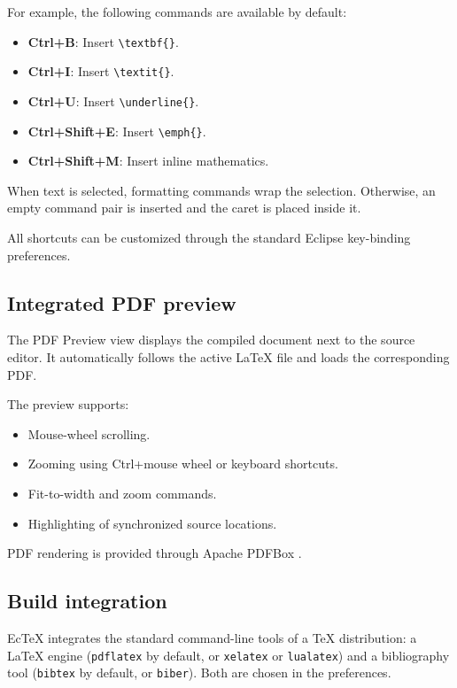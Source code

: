 \documentclass[11pt,a4paper]{article}
\begin{document}
For example, the following commands are available by
default:

\begin{itemize}[noitemsep]
    \item \textbf{Ctrl+B}: Insert \verb|\textbf{}|.
    \item \textbf{Ctrl+I}: Insert \verb|\textit{}|.
    \item \textbf{Ctrl+U}: Insert \verb|\underline{}|.
    \item \textbf{Ctrl+Shift+E}: Insert \verb|\emph{}|.
    \item \textbf{Ctrl+Shift+M}: Insert inline mathematics.
\end{itemize}

When text is selected, formatting commands wrap the
selection. Otherwise, an empty command pair is inserted
and the caret is placed inside it.

All shortcuts can be customized through the standard
Eclipse key-binding preferences.

\subsection{Integrated PDF preview}

The PDF Preview view displays the compiled document
next to the source editor. It automatically follows the
active LaTeX file and loads the corresponding PDF.

The preview supports:
\begin{itemize}[noitemsep]
    \item Mouse-wheel scrolling.
    \item Zooming using Ctrl+mouse wheel or keyboard
    shortcuts.
    \item Fit-to-width and zoom commands.
    \item Highlighting of synchronized source locations.
\end{itemize}

PDF rendering is provided through Apache PDFBox
\cite{pdfbox}.

\subsection{Build integration}

EcTeX integrates the standard command-line tools of a TeX
distribution: a LaTeX engine (\texttt{pdflatex} by default, or
\texttt{xelatex} or \texttt{lualatex}) and a bibliography tool
(\texttt{bibtex} by default, or \texttt{biber}). Both are chosen
in the preferences.
\end{document}
